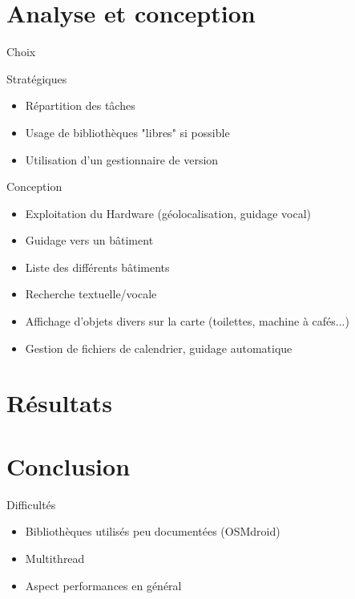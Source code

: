 \documentclass{beamer}
\begin{document}
		\section{Analyse et conception}
		\begin{frame}{Choix}
			\begin{block}{Stratégiques}
				\begin{itemize}
					\item Répartition des tâches
					\item Usage de bibliothèques "libres" si possible
					\item Utilisation d'un gestionnaire de version
				\end{itemize}
			\end{block}		
			\pause
			\begin{block}{Conception}
				\begin{itemize}
					\item Exploitation du Hardware (géolocalisation, guidage vocal)
					\item Guidage vers un bâtiment
					\item Liste des différents bâtiments
					\item Recherche textuelle/vocale
					\item Affichage d'objets divers sur la carte (toilettes, machine à cafés...)
					\item Gestion de fichiers de calendrier, guidage automatique
				\end{itemize}
			\end{block}
		\end{frame}
		
	\section{Résultats}
	
	\section{Conclusion}
		\begin{frame}{Difficultés}
			\begin{itemize}
				\item Bibliothèques utilisés peu documentées (OSMdroid)
				\item Multithread
				\item Aspect performances en général
			\end{itemize}
		\end{frame}
		
\end{document}
